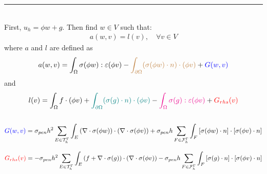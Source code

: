 \begin{frame}[t]
\begin{columns}[T]
    \normalsize
    \begin{column}{.52\textwidth}
        \color{orange}\rule{\linewidth}{4pt}
        \phifem 
        \color{black} \\ \footnotesize
        First, $u_h = \phi w + g$. Then find $w \in V$ such that:
        \begin{align*}
            a(w,v)=l(v), \quad \forall v \in V
        \end{align*}
        where $a$ and $l$ are defined as 
        $$
        a(w,v) = \int_{\Omega} \sigma(\phi w) : \varepsilon(\phi v) - \textcolor{brown}{\int_{\partial\Omega} (\sigma(\phi w) \cdot n) \cdot (\phi v)} + \textcolor{blue}{G(w,v)}
        $$
        and
        $$
        l(v) = \int_{\Omega} f \cdot (\phi v) + \textcolor{teal}{\int_{\partial\Omega} (\sigma(g) \cdot n) \cdot (\phi v)} - \textcolor{magenta}{\int_{\Omega} \sigma(g) : \varepsilon(\phi v)} + \textcolor{red}{G_{rhs}(v)}
        $$        
    \end{column}%
\end{columns}
\pause
\footnotesize
$$
\textcolor{blue}{G(w,v)} = \sigma_{pen} h^2 \sum_{E \in \mathcal{T}_h^{\Gamma}} \int_{E} \left(\nabla \cdot \sigma(\phi w)\right) \cdot \left( \nabla \cdot \sigma(\phi v)\right) + \sigma_{pen} h \sum_{F \in \mathcal{F}_h^{\Gamma}} \int_{F} \left[\sigma(\phi w) \cdot n \right] \cdot \left[ \sigma(\phi v) \cdot n \right] 
$$ 

$$
\textcolor{red}{G_{rhs}(v)} = - \sigma_{pen} h^2 \sum_{E \in \mathcal{T}_h^{\Gamma}} \int_{E} \left( f + \nabla \cdot \sigma(g) \right) \cdot \left( \nabla \cdot \sigma(\phi v)\right) - \sigma_{pen} h \sum_{F \in \mathcal{F}_h^{\Gamma}} \int_{F} \left[\sigma(g) \cdot n \right] \cdot \left[ \sigma(\phi v) \cdot n \right]
$$


\end{frame}

\small

